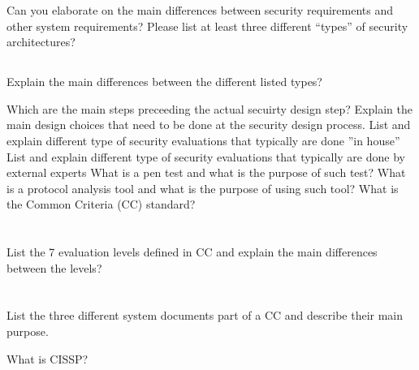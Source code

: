 \begin{questions}
\question{} Can you elaborate on the main differences between security requirements and other system requirements?
\question{} Please list at least three different “types” of security architectures?
  \begin{parts}
  \part{} Explain the main differences between the different listed types?
  \end{parts}

\question{} Which are the main steps preceeding the actual secuirty design step?
\question{} Explain the main design choices that need to be done at the security design process.
\question{} List and explain different type of security evaluations that typically are done ”in house”
\question{} List and explain different type of security evaluations that typically are done by external experts
\question{} What is a pen test and what is the purpose of such test?
\question{} What is a protocol analysis tool and what is the purpose of using such tool?
\question{} What is the Common Criteria (CC) standard?
  \begin{parts}
  \part{} List the 7 evaluation levels defined in CC and explain the main differences between the levels?
  \part{} List the three different system documents part of a CC and describe their main purpose.
  \end{parts}

\question{} What is CISSP?\@
\end{questions}

